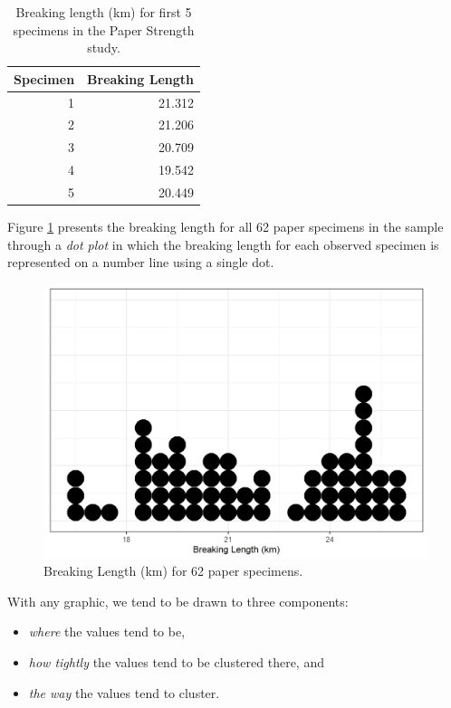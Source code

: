 \documentclass[
]{book}
\providecommand{\tightlist}{%
  \setlength{\itemsep}{0pt}\setlength{\parskip}{0pt}}
\theoremstyle{plain}
\theoremstyle{mydefn}
\theoremstyle{myexmpl}
\theoremstyle{remark}
\begin{document}
\begin{table}

\caption{\label{tab:summaries-paper-table}Breaking length (km) for first 5 specimens in the Paper Strength study.}
\centering
\begin{tabular}[t]{r|r}
\hline
Specimen & Breaking Length\\
\hline
1 & 21.312\\
\hline
2 & 21.206\\
\hline
3 & 20.709\\
\hline
4 & 19.542\\
\hline
5 & 20.449\\
\hline
\end{tabular}
\end{table}

Figure \ref{fig:summaries-paper-dotplot} presents the breaking length for all 62 paper specimens in the sample through a \emph{dot plot} in which the breaking length for each observed specimen is represented on a number line using a single dot.

\begin{figure}

{\centering \includegraphics[width=0.8\linewidth]{./Images/summaries-paper-dotplot-1} 

}

\caption{Breaking Length (km) for 62 paper specimens.}\label{fig:summaries-paper-dotplot}
\end{figure}

With any graphic, we tend to be drawn to three components:

\begin{itemize}
\tightlist
\item
  \emph{where} the values tend to be,
\item
  \emph{how tightly} the values tend to be clustered there, and
\item
  \emph{the way} the values tend to cluster.
\end{itemize}
\end{document}
